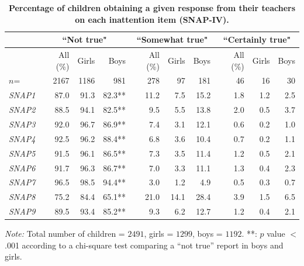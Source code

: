 \documentclass[10pt,letterpaper]{article}
\begin{document}
\begin{table}[!ht]
\begin{adjustwidth}{-5mm}{0in} %
\centering
\caption{ \bf Percentage of children obtaining a given response from their teachers on each inattention item (SNAP-IV).} 
\vspace{5mm}
\begin{tabular}{|lrrr|rrr|rrr|}
\hline
                & \multicolumn{3}{c|}{``Not true"}  &  \multicolumn{3}{c}{``Somewhat true"}\ &  \multicolumn{3}{|c|}{``Certainly true"}\\ \hline
                    & All  (\%) & Girls & Boys  & All (\%)  & Girls & Boys & All  (\%) & Girls & Boys\\  
                     $n$=&2167 & 1186 & 981 &278 &97 & 181 &46 & 16 & 30\\\hline
{\it SNAP1}   & 87.0 & 91.3 & 82.3**  & 11.2 & 7.5   & 15.2  & 1.8 & 1.2 & 2.5\\  \hline
{\it SNAP2}  &88.5 & 94.1   & 82.5** & 9.5 & 5.5 & 13.8 & 2.0 & 0.5 & 3.7\\  \hline
{\it SNAP3}   & 92.0  &  96.7 &  86.9** & 7.4 & 3.1 & 12.1 & 0.6 & 0.2 & 1.0 \\   \hline
{\it SNAP4}   & 92.5  & 96.2   & 88.4**  & 6.8 & 3.6 & 10.4 & 0.7& 0.2 & 1.1 \\   \hline
{\it SNAP5}  &  91.5 & 96.1 & 86.5**  & 7.3 & 3.5  & 11.4  &1.2 & 0.5 & 2.1  \\   \hline
{\it SNAP6}   & 91.7 & 96.3 & 86.7**  & 7.0 & 3.3 & 11.1 & 1.3 & 0.4 & 2.3 \\   \hline
{\it SNAP7}   & 96.5 & 98.5   & 94.4**   & 3.0  & 1.2 & 4.9 & 0.5 & 0.3 & 0.7 \\   \hline
{\it SNAP8}   & 75.2 & 84.4   & 65.1**  & 21.0  & 14.1  & 28.4 &  3.9 & 1.5 & 6.5\\    \hline
{\it SNAP9}   & 89.5 & 93.4 & 85.2** & 9.3 & 6.2 & 12.7 & 1.2 & 0.4  & 2.1 \\  \hline
\end{tabular}
\label{Numerical_SNAP}
\end{adjustwidth}
\textit{Note:} {Total number of children = $2491$, girls = $1299$, boys = $1192$.  **: $p$ value $<$.001 according to a chi-square test comparing a ``not true'' report in boys and girls.} \\ 
\end{table}
\end{document}
